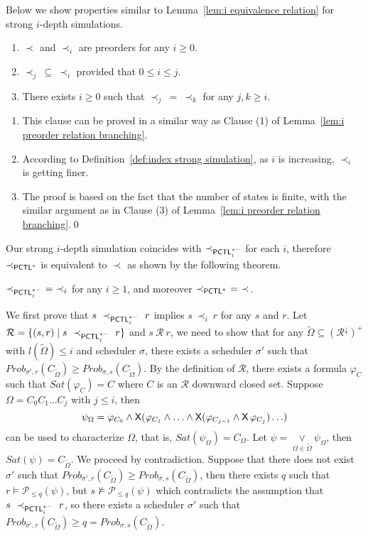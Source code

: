 \documentclass{LMCS}
\def\phi{\varphi}
\DeclareMathOperator{\X}{\text{\sf X}}
\newcommand{\PCTL}{{\sf PCTL}}
\newcommand{\iSi}[1]{\prec_{#1}}
\newcommand{\SEPCTLS}{\prec_{\PCTL^{*}}}
\newcommand{\iSEPCTLSM}[1]{\prec_{\PCTL_{#1}^{*-}}}
\newcommand{\MC}[1]{\mathcal{#1}}
\newcommand{\MEASURE}{\mathit{Prob}}
\newcommand{\DOWNWARD}[2]{#1^{\downarrow}#2}
\begin{document}
Below we show properties similar to Lemma~\ref{lem:i equivalence relation} for strong $i$-depth simulations.
\begin{lem}\label{lem:i preorder relation}\hfill
\begin{enumerate}[\em(1)]
\item $\iSi{}$ and $\iSi{i}$ are preorders for any $i\geq0$.
\item $\iSi{j}~\subseteq~\iSi{i}$ provided that $0\leq i \leq j$.
\item There exists $i\geq 0$ such that $\iSi{j}~=~\iSi{k}$ for any $j,k\geq i$.
\end{enumerate}
\end{lem}
\proof\hfill
\begin{enumerate}[(1)]
\item This clause can be proved in a similar way as Clause (1) of Lemma~\ref{lem:i preorder relation branching}.
\item According to Definition~\ref{def:index strong simulation}, as
  $i$ is increasing, $\iSi{i}$ is getting finer. 
\item The proof is based on the fact that the number of states is
  finite, with the similar argument as in Clause (3) of Lemma~\ref{lem:i preorder relation branching}.\qed
\end{enumerate}


\noindent Our strong $i$-depth simulation coincides with
$\iSEPCTLSM{i}$ for each $i$, therefore $\SEPCTLS$ is equivalent to
$\iSi{}$ as shown by the following theorem.
\begin{thm}\label{thm:characterization strong simulation}
$\iSEPCTLSM{i}~=~\iSi{i}$ for any $i\geq 1$, and moreover $\SEPCTLS~=~\iSi{}$.
\end{thm}

\proof
  We first prove that $s~\iSEPCTLSM{i}~r$ implies $s~\iSi{i}~r$ for
  any $s$ and $r$. Let $\MC{R}=\{(s,r)\mid s~\iSEPCTLSM{i}~r\}$ and
  $s~\MC{R}~r$, we need to show that for any
  $\widetilde{\Omega}\subseteq (\DOWNWARD{\MC{R}}{})^+$ with
  $l(\widetilde{\Omega})\leq i$ and scheduler $\sigma$, there exists a
  scheduler $\sigma'$ such that
  $\MEASURE_{\sigma',r}(C_{\widetilde{\Omega}})\geq\MEASURE_{\sigma,s}(C_{\widetilde{\Omega}})$. By
  the definition of $\MC{R}$, there exists a formula $\phi_C$ such
  that $\mathit{Sat}(\phi_C)=C$ where $C$ is an $\MC{R}$ downward closed
  set. Suppose $\Omega=C_0C_1\ldots C_j$ with $j\leq i$, then
$$\psi_{\Omega}=\phi_{C_0}\land\X(\phi_{C_1}\land\ldots\land\X(\phi_{C_{j-1}}\land\X\phi_{C_j})\ldots)
$$
can be used to characterize $\Omega$, that is, $\mathit{Sat}(\psi_{\Omega})=C_{\Omega}$. Let $\psi=\mathop{\lor}\limits_{\Omega\in\widetilde{\Omega}}\psi_{\Omega}$, then $\mathit{Sat}(\psi)=C_{\widetilde{\Omega}}$. We proceed by contradiction. Suppose that there does not exist $\sigma'$ such that $\MEASURE_{\sigma',r}(C_{\widetilde{\Omega}})\geq\MEASURE_{\sigma,s}(C_{\widetilde{\Omega}})$, then there exists $q$ such that $r\models\MC{P}_{\leq q}(\psi)$, but $s\not\models\MC{P}_{\leq q}(\psi)$ which contradicts the assumption that $s~\iSEPCTLSM{i}~r$, so there exists a scheduler $\sigma'$ such that $\MEASURE_{\sigma',r}(C_{\widetilde{\Omega}})\geq q =\MEASURE_{\sigma,s}(C_{\widetilde{\Omega}})$.
\end{document}
